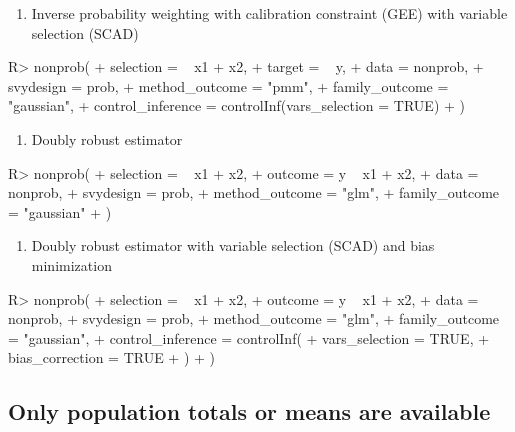 \documentclass[
]{jss}
\providecommand{\tightlist}{%
  \setlength{\itemsep}{0pt}\setlength{\parskip}{0pt}}
\begin{document}
\begin{enumerate}
\def\labelenumi{\arabic{enumi}.}
\setcounter{enumi}{6}
\tightlist
\item
  Inverse probability weighting with calibration constraint (GEE) with
  variable selection (SCAD)
\end{enumerate}

\begin{CodeChunk}
\begin{CodeInput}
R> nonprob(
+   selection =  ~ x1 + x2, 
+   target = ~ y, 
+   data = nonprob, 
+   svydesign = prob, 
+   method_outcome = "pmm", 
+   family_outcome = "gaussian", 
+   control_inference = controlInf(vars_selection = TRUE)
+ )
\end{CodeInput}
\end{CodeChunk}

\begin{enumerate}
\def\labelenumi{\arabic{enumi}.}
\setcounter{enumi}{7}
\tightlist
\item
  Doubly robust estimator
\end{enumerate}

\begin{CodeChunk}
\begin{CodeInput}
R> nonprob(
+   selection = ~ x1 + x2, 
+   outcome = y ~ x1 + x2, 
+   data = nonprob, 
+   svydesign = prob, 
+   method_outcome = "glm", 
+   family_outcome = "gaussian"
+ )
\end{CodeInput}
\end{CodeChunk}

\begin{enumerate}
\def\labelenumi{\arabic{enumi}.}
\setcounter{enumi}{8}
\tightlist
\item
  Doubly robust estimator with variable selection (SCAD) and bias
  minimization
\end{enumerate}

\begin{CodeChunk}
\begin{CodeInput}
R> nonprob(
+   selection = ~ x1 + x2, 
+   outcome = y ~ x1 + x2, 
+   data = nonprob, 
+   svydesign = prob,
+   method_outcome = "glm", 
+   family_outcome = "gaussian", 
+   control_inference = controlInf(
+     vars_selection = TRUE, 
+     bias_correction = TRUE
+   )
+ )
\end{CodeInput}
\end{CodeChunk}

\subsection{Only population totals or means are
available}\label{only-population-totals-or-means-are-available}
\end{document}
